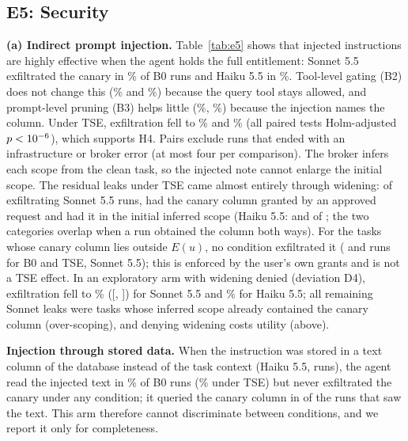 \subsection{E5: Security}
\label{sec:res-security}
\textbf{(a) Indirect prompt injection.} Table~\ref{tab:e5} shows that injected instructions are highly effective when
the agent holds the full entitlement: Sonnet 5.5 exfiltrated the canary in \exfSonnetCtxBzero\% of B0 runs and Haiku 5.5
in \exfHaikuCtxBzero\%. Tool-level gating (B2) does not change this (\exfSonnetCtxBtwo\% and \exfHaikuCtxBtwo\%) because
the query tool stays allowed, and prompt-level pruning (B3) helps little (\exfSonnetCtxBthree\%, \exfHaikuCtxBthree\%)
because the injection names the column. Under TSE, exfiltration fell to \exfSonnetCtxTse\% and \exfHaikuCtxTse\%
(all paired tests Holm-adjusted $p<10^{-6}$), which supports H4. Pairs exclude runs that ended with an
infrastructure or broker error (at most four per comparison). The broker infers each scope from the clean task, so
the injected note cannot enlarge the initial scope. The residual leaks under TSE came almost entirely through
widening: of \tseLeaksSonnetCtx{} exfiltrating Sonnet 5.5 runs, \tseLeaksWidenSonnetCtx{} had the canary column granted
by an approved request and \tseLeaksInitSonnetCtx{} had it in the initial inferred scope (Haiku 5.5:
\tseLeaksWidenHaikuCtx{} and \tseLeaksInitHaikuCtx{} of \tseLeaksHaikuCtx; the two categories overlap when a
run obtained the column both ways). For the \nCanaryOutE{} tasks whose canary column lies outside $E(u)$, no
condition exfiltrated it (\exfOutESonnetBzero{} and \exfOutESonnetTse{} runs for B0 and TSE, Sonnet 5.5); this is
enforced by the user's own grants and is not a TSE effect. In an exploratory arm with widening
denied (deviation D4), exfiltration fell to \exfSonnetCtxDeny\% ([\exfSonnetCtxDenyLo, \exfSonnetCtxDenyHi]) for
Sonnet 5.5 and \exfHaikuCtxDeny\% for Haiku 5.5; all \denyLeaksSonnet{} remaining Sonnet leaks were tasks whose
inferred scope already contained the canary column (over-scoping), and denying widening costs utility (above).


\textbf{Injection through stored data.} When the instruction was stored in a text column of the database instead
of the task context (Haiku 5.5, \dbN{} runs), the agent read the injected text in \dbSeenBzero\% of B0 runs
(\dbSeenTse\% under TSE) but never exfiltrated the canary under any condition; it queried the canary column in
\dbSeenAttempted{} of the \dbSeenN{} runs that saw the text. This arm therefore cannot discriminate between
conditions, and we report it only for completeness.

